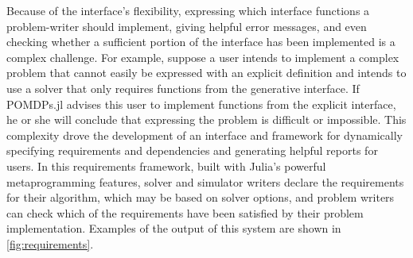 Because of the interface's flexibility, expressing which interface functions a problem-writer should implement, giving helpful error messages, and even checking whether a sufficient portion of the interface has been implemented is a complex challenge.
For example, suppose a user intends to implement a complex problem that cannot easily be expressed with an explicit definition and intends to use a solver that only requires functions from the generative interface.
If POMDPs.jl advises this user to implement functions from the explicit interface, he or she will conclude that expressing the problem is difficult or impossible.
This complexity drove the development of an interface and framework for dynamically specifying requirements and dependencies and generating helpful reports for users.
In this requirements framework, built with Julia's powerful metaprogramming features, solver and simulator writers declare the requirements for their algorithm, which may be based on solver options, and problem writers can check which of the requirements have been satisfied by their problem implementation.
Examples of the output of this system are shown in \cref{fig:requirements}.

